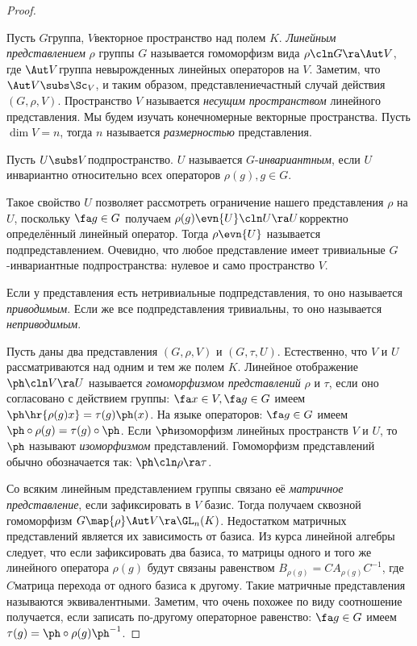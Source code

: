 \documentclass[a4paper]{article}
\begin{document}
\begin{proof}
\begin{df}
Пусть $G$\т группа, $V$\т векторное пространство над полем $K$.  \emph{Линейным представлением} $\rho$ группы
$G$ называется гомоморфизм вида $\rho\cln G \ra \Aut V$, где $\Aut V$\т группа невырожденных линейных операторов
на $V$. Заметим, что $\Aut V \subs \Sc_V$, и таким образом, представление\т частный случай действия $(G,
\rho, V)$. Пространство $V$ называется \emph{несущим пространством} линейного представления. Мы будем изучать
конечномерные векторные пространства. Пусть $\dim V = n$, тогда $n$ называется \emph{размерностью}
представления.
\end{df}

\begin{df}
Пусть $U \subs V$\т подпространство. $U$ называется $G$-\emph{инвариантным},  если $U$ инвариантно
относительно всех операторов $\rho(g), g \in G$.
\end{df}

Такое свойство $U$ позволяет рассмотреть ограничение нашего
представления $\rho$ на $U$, поскольку $\fa g \in G$ получаем $\rho(g)\evn{U}\cln U \ra U$\т корректно
определённый линейный оператор. Тогда $\rho\evn{U}$ называется подпредставлением. Очевидно, что любое
представление имеет тривиальные $G$-инвариантные подпространства: нулевое и само пространство $V$.

\begin{df}
Если у представления есть нетривиальные подпредставления, то оно называется \emph{приводимым}. Если же
все подпредставления тривиальны, то оно называется \emph{неприводимым}.
\end{df}

\begin{df}
Пусть даны два представления $(G, \rho, V)$ и $(G, \tau, U)$. Естественно, что  $V$ и $U$ рассматриваются над
одним и тем же полем $K$. Линейное отображение $\ph\cln V \ra U$ называется \emph{гомоморфизмом представлений}
$\rho$ и $\tau$, если оно согласовано с действием группы: $\fa x \in V, \fa g \in G$ имеем
$\ph\hr{\rho(g)x}=\tau(g)\ph(x)$. На языке операторов: $\fa g \in G$ имеем $\ph \circ \rho(g) = \tau(g) \circ
\ph$. Если $\ph$\т изоморфизм линейных пространств $V$ и $U$, то $\ph$ называют \emph{изоморфизмом}
представлений. Гомоморфизм представлений обычно обозначается так: $\ph\cln \rho \ra \tau$.
\end{df}

Со всяким линейным представлением группы связано её \emph{матричное представление},  если зафиксировать в $V$
базис. Тогда получаем сквозной гомоморфизм $G \map{\rho} \Aut V \ra \GL_n(K)$. Недостатком матричных
представлений является их зависимость от базиса. Из курса линейной алгебры следует, что если зафиксировать
два базиса, то матрицы одного и того же линейного оператора $\rho(g)$ будут связаны равенством
$B_{\rho(g)}=CA_{\rho(g)}C^{-1}$, где $C$\т матрица перехода от одного базиса к другому. Такие матричные
представления называются эквивалентными. Заметим, что очень похожее по виду соотношение получается, если
записать по-другому операторное равенство: $\fa g \in G$ имеем $\tau(g)=\ph\circ\rho(g)\ph^{-1}$.


\end{proof}
\end{document}
